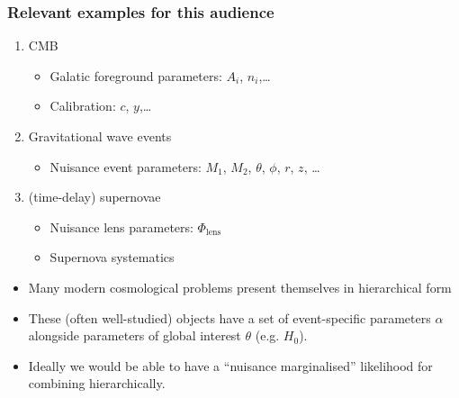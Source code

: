 \documentclass[aspectratio=169]{beamer}
\begin{document}
\begin{frame}
    \frametitle{Relevant examples for this audience}
    \begin{enumerate}
        \item CMB
            \begin{itemize}
                \item Galatic foreground parameters: $A_i$, $n_i$,\ldots
                \item Calibration: $c$, $y$,\ldots
            \end{itemize}
        \item Gravitational wave events
            \begin{itemize}
                \item Nuisance event parameters: $M_1$, $M_2$, $\theta$, $\phi$, $r$, $z$, \ldots
            \end{itemize}
        \item (time-delay) supernovae
            \begin{itemize}
                \item Nuisance lens parameters: $\Phi_\text{lens}$
                \item Supernova systematics
            \end{itemize}
    \end{enumerate}
    \begin{itemize}
        \item Many modern cosmological problems present themselves in hierarchical form
        \item These (often well-studied) objects have a set of event-specific parameters $\alpha$ alongside  parameters of global interest $\theta$ (e.g. $H_0$).
        \item Ideally we would be able to have a ``nuisance marginalised'' likelihood for combining hierarchically.
    \end{itemize}
\end{frame}
\end{document}
